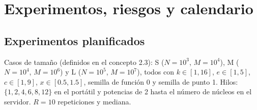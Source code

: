 \section{Experimentos, riesgos y calendario}\label{sec:experimentos}

\subsection{Experimentos planificados}

Casos de tamaño (definidos en el concepto 2.3): S ($N=10^3$, $M=10^4$), M ($N=10^4$, $M=10^6$) y L ($N=10^5$, $M=10^7$), todos con $k\in[1,16]$, $e\in[1,5]$, $c\in[1,9]$, $x\in[0.5,1.5]$, semilla de función 0 y semilla de punto 1. Hilos: $\{1,2,4,6,8,12\}$ en el portátil y potencias de 2 hasta el número de núcleos en el servidor. $R=10$ repeticiones y mediana.

